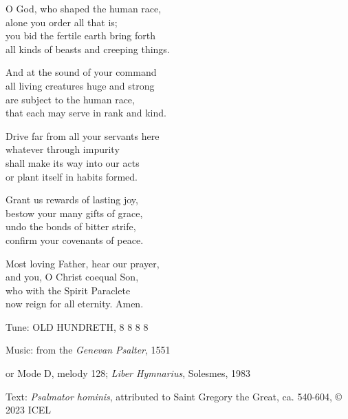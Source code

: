\hymn

\begin{hymnverse}
O God, who shaped the human race,\\
alone you order all that is;\\
you bid the fertile earth bring forth\\
all kinds of beasts and creeping things.

And at the sound of your command\\
all living creatures huge and strong\\
are subject to the human race,\\
that each may serve in rank and kind.

Drive far from all your servants here\\
whatever through impurity\\
shall make its way into our acts\\
or plant itself in habits formed.

Grant us rewards of lasting joy,\\
bestow your many gifts of grace,\\
undo the bonds of bitter strife,\\
confirm your covenants of peace.

Most loving Father, hear our prayer,\\
and you, O Christ coequal Son,\\
who with the Spirit Paraclete\\
now reign for all eternity. Amen.
\end{hymnverse}

\begin{hymnsource}
Tune: OLD HUNDRETH, 8 8 8 8

Music: from the \emph{Genevan Psalter}, 1551

or Mode D, melody 128; \emph{Liber Hymnarius}, Solesmes, 1983

Text: \emph{Psalmator hominis}, attributed to Saint Gregory the Great, ca. 540-604, © 2023 ICEL
\end{hymnsource}